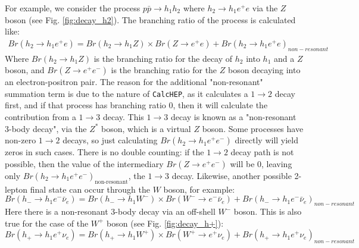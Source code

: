 \documentclass[12pt]{article}
\begin{document}
For example, we consider the process $p\bar{p} \rightarrow h_1h_2$ where $ h_2\rightarrow h_1 e^+e$ via the $Z$ boson (see Fig. \ref{fig:decay_h2}). The branching ratio of the process is calculated like:
\begin{equation}
    \begin{split}
        Br(h_2 \rightarrow h_1 e^+e) = Br(h_2\rightarrow h_1Z) \times Br(Z\rightarrow e^+e) + Br(h_2 \rightarrow h_1 e^+e)_{non-resonant}
        \label{eqn:branching_Z}
    \end{split}
\end{equation}
Where $Br(h_2 \rightarrow h_1 Z)$ is the branching ratio for the decay of $h_2$ into $h_1$ and a $Z$ boson, and $Br(Z \rightarrow e^+ e^-)$ is the branching ratio for the $Z$ boson decaying into an electron-positron pair. The reason for the additional "non-resonant" summation term is due to the nature of \verb|CalcHEP|, as it calculates a $1\rightarrow2$ decay first, and if that process has branching ratio 0, then it will calculate the contribution from a $1\rightarrow3$ decay. This $1\rightarrow3$ decay is known as a "non-resonant 3-body decay", via the $Z^*$ boson, which is a virtual $Z$ boson. Some processes have non-zero $1\rightarrow2$ decays, so just calculating $Br(h_2 \rightarrow h_1 e^+e^-)$ directly will yield zeros in such cases. There is no double counting: if the $1\rightarrow2$ decay path is not possible, then the value of the intermediary $Br(Z\rightarrow e^+e^-)$ will be 0, leaving only $Br(h_2 \rightarrow h_1 e^+e^-)_{\text{non-resonant}}$, the $1\rightarrow3$ decay. Likewise, another possible 2-lepton final state can occur through the $W$ boson, for example:
\begin{equation}
    Br(h_-\rightarrow h_1e^- \bar{\nu}_e) = Br(h_-\rightarrow h_1 W^-) \times Br(W^- \rightarrow e^- \bar{\nu}_e) + Br(h_-\rightarrow h_1e^- \bar{\nu}_e)_{non-resonant}
\end{equation}
Here there is a non-resonant 3-body decay via an off-shell ${W^-}$ boson. This is also true for the case of the $W^+$ boson (see Fig. \ref{fig:decay_h+}):
\begin{equation}
    Br(h_+\rightarrow h_1e^+ \nu_e) = Br(h_+\rightarrow h_1 W^+) \times Br(W^+ \rightarrow e^+ \nu_e) + Br(h_+\rightarrow h_1e^+ \nu_e)_{non-resonant}
\end{equation}
\end{document}
